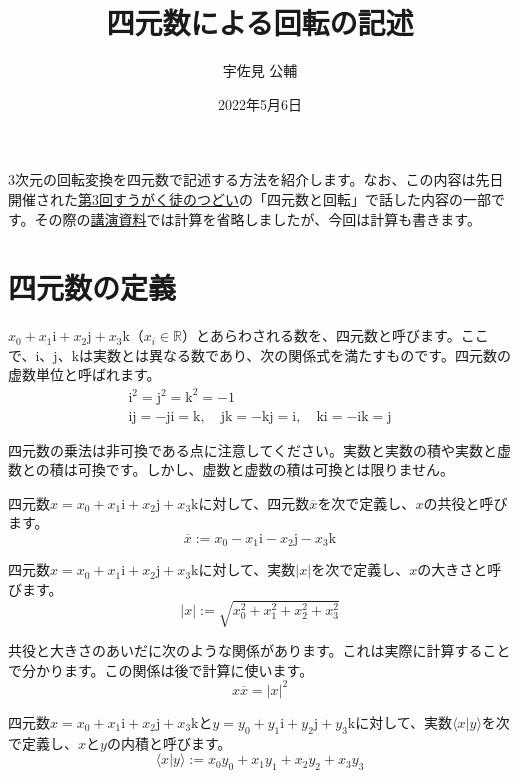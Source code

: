 \documentclass{jlreq}
\title{四元数による回転の記述}
\author{宇佐見 公輔}
\date{2022年5月6日}
\numberwithin{equation}{section}
\newcommand{\ii}{\mathrm{i}}
\newcommand{\jj}{\mathrm{j}}
\newcommand{\kk}{\mathrm{k}}
\begin{document}
\maketitle

3次元の回転変換を四元数で記述する方法を紹介します。なお、この内容は先日開催された\href{https://tsudoionline.netlify.app/03/}{第3回すうがく徒のつどい}の「四元数と回転」で話した内容の一部です。その際の\href{https://github.com/usami-k/mathematics/blob/master/2022/QuaternionRotationTsudoi/QuaternionRotationTsudoi.pdf}{講演資料}では計算を省略しましたが、今回は計算も書きます。

\section{四元数の定義}

\begin{definition}[四元数]
    $x_0+x_1\ii+x_2\jj+x_3\kk$（$x_i\in\mathbb{R}$）とあらわされる数を、四元数と呼びます。ここで、$\ii$、$\jj$、$\kk$は実数とは異なる数であり、次の関係式を満たすものです。四元数の虚数単位と呼ばれます。
    \begin{gather}
        \ii^2=\jj^2=\kk^2=-1\\
        \ii\jj=-\jj\ii=\kk,\quad\jj\kk=-\kk\jj=\ii,\quad\kk\ii=-\ii\kk=\jj
    \end{gather}
\end{definition}

四元数の乗法は非可換である点に注意してください。実数と実数の積や実数と虚数との積は可換です。しかし、虚数と虚数の積は可換とは限りません。

四元数$x=x_0+x_1\ii+x_2\jj+x_3\kk$に対して、四元数$\overline{x}$を次で定義し、$x$の共役と呼びます。
\begin{equation}
    \overline{x}:=x_0-x_1\ii-x_2\jj-x_3\kk
\end{equation}

四元数$x=x_0+x_1\ii+x_2\jj+x_3\kk$に対して、実数$|x|$を次で定義し、$x$の大きさと呼びます。
\begin{equation}
    |x|:=\sqrt{x_0^2+x_1^2+x_2^2+x_3^2}
\end{equation}

共役と大きさのあいだに次のような関係があります。これは実際に計算することで分かります。この関係は後で計算に使います。
\begin{equation}
    x\overline{x}=|x|^2
\end{equation}

四元数$x=x_0+x_1\ii+x_2\jj+x_3\kk$と$y=y_0+y_1\ii+y_2\jj+y_3\kk$に対して、実数$\langle x|y\rangle$を次で定義し、$x$と$y$の内積と呼びます。
\begin{equation}
    \langle x|y\rangle:=x_0y_0+x_1y_1+x_2y_2+x_3y_3
\end{equation}
\end{document}
